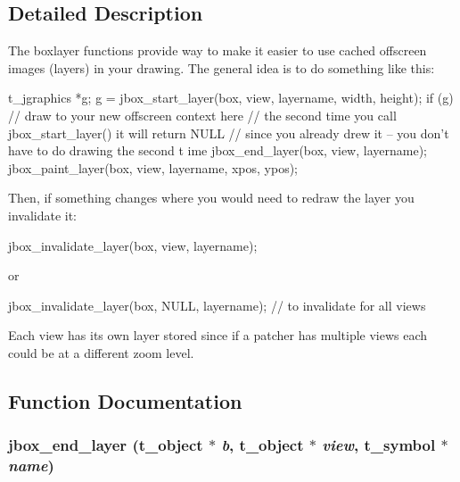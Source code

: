 \subsection{Detailed Description}
The boxlayer functions provide way to make it easier to use cached offscreen images (layers) in your drawing. The general idea is to do something like this:


\begin{DoxyCode}
    t_jgraphics *g;
    g = jbox_start_layer(box, view, layername, width, height);
    if (g) {
        // draw to your new offscreen context here
        // the second time you call jbox_start_layer() it will return NULL
        // since you already drew it -- you don't have to do drawing the second t
      ime
        jbox_end_layer(box, view, layername);
    }
    jbox_paint_layer(box, view, layername, xpos, ypos);
\end{DoxyCode}


Then, if something changes where you would need to redraw the layer you invalidate it: 
\begin{DoxyCode}
    jbox_invalidate_layer(box, view, layername);
\end{DoxyCode}
 or 
\begin{DoxyCode}
    jbox_invalidate_layer(box, NULL, layername); // to invalidate for all views
\end{DoxyCode}


Each view has its own layer stored since if a patcher has multiple views each could be at a different zoom level. 

\subsection{Function Documentation}
\hypertarget{group__boxlayer_gae8607b453997030d7bc252b40d066884}{
\subsubsection[{jbox\_\-end\_\-layer}]{ jbox\_\-end\_\-layer ({\bf t\_\-object} $\ast$ {\em b}, \/  {\bf t\_\-object} $\ast$ {\em view}, \/  {\bf t\_\-symbol} $\ast$ {\em name})}}
\label{group__boxlayer_gae8607b453997030d7bc252b40d066884}


